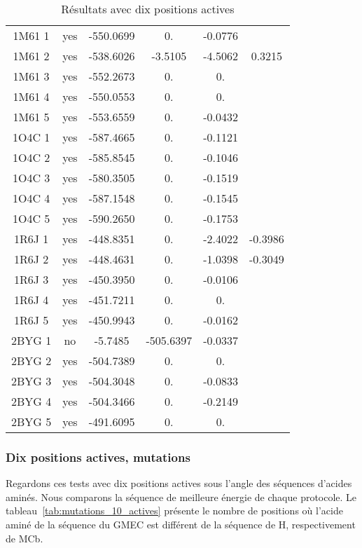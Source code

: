 \begin{table}[h]
\begin{tabular}{cccccc}
        1M61 1 & yes & -550.0699 & 0. & -0.0776 & \\
        1M61 2 & yes & -538.6026 & -3.5105 & -4.5062 & 0.3215 \\
        1M61 3 & yes & -552.2673 & 0. & 0. & \\
        1M61 4 & yes & -550.0553 & 0. & 0. & \\
        1M61 5 & yes & -553.6559 & 0. & -0.0432 & \\
        1O4C 1 & yes & -587.4665 & 0. & -0.1121 & \\
        1O4C 2 & yes & -585.8545 & 0. & -0.1046 & \\
        1O4C 3 & yes & -580.3505 & 0. & -0.1519 & \\
        1O4C 4 & yes & -587.1548 & 0. & -0.1545 & \\
        1O4C 5 & yes & -590.2650 & 0. & -0.1753 & \\
        1R6J 1 & yes & -448.8351 & 0. & -2.4022 & -0.3986 \\
        1R6J 2 & yes & -448.4631 & 0. & -1.0398 & -0.3049 \\
        1R6J 3 & yes & -450.3950 & 0. & -0.0106 & \\
        1R6J 4 & yes & -451.7211 & 0. & 0. & \\
        1R6J 5 & yes & -450.9943 & 0. & -0.0162 & \\
        2BYG 1 & no  & -5.7485   & -505.6397 & -0.0337 & \\
        2BYG 2 & yes & -504.7389 & 0. & 0. & \\
        2BYG 3 & yes & -504.3048 & 0. & -0.0833 & \\
        2BYG 4 & yes & -504.3466 & 0. & -0.2149 & \\
        2BYG 5 & yes & -491.6095 & 0. & 0. & \\
        
        \bottomrule


 \end{tabular}      
 \caption{Résultats avec dix positions actives }
\label{tab:result_10_actives}
\end{table}

   \subsubsection{Dix positions actives, mutations}

Regardons ces tests avec dix positions actives sous l'angle des séquences d'acides aminés. Nous comparons la séquence de meilleure énergie de chaque protocole. Le tableau~\ref{tab:mutations_10_actives} présente le nombre de positions où l'acide aminé de la séquence du GMEC est différent de la séquence de H, respectivement de MCb.

